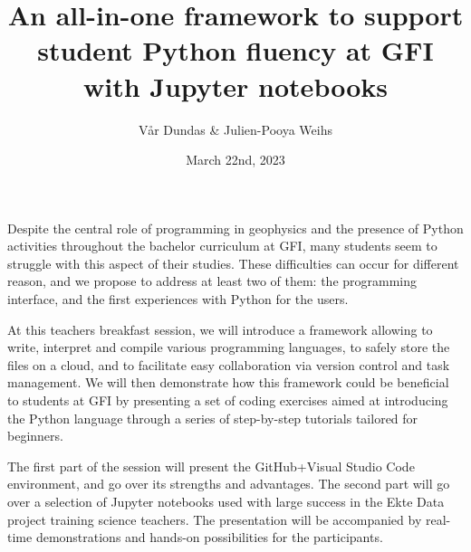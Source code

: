 \documentclass{article}
\title{An all-in-one framework to support student Python fluency at GFI with Jupyter notebooks}
\date{March 22nd, 2023}
\author{Vår Dundas \& Julien-Pooya Weihs}
\begin{document}
\maketitle

Despite the central role of programming in geophysics and the presence of Python activities throughout the bachelor curriculum at GFI, many students seem to struggle with this aspect of their studies. These difficulties can occur for different reason, and we propose to address at least two of them: the programming interface, and the first experiences with Python for the users. 

At this teachers breakfast session, we will introduce a framework allowing to write, interpret and compile various programming languages, to safely store the files on a cloud, and to facilitate easy collaboration via version control and task management. We will then demonstrate how this framework could be beneficial to students at GFI by presenting a set of coding exercises aimed at introducing the Python language through a series of step-by-step tutorials tailored for beginners.

The first part of the session will present the GitHub+Visual Studio Code environment, and go over its strengths and advantages. The second part will go over a selection of Jupyter notebooks used with large success in the Ekte Data project training science teachers. The presentation will be accompanied by real-time demonstrations and hands-on possibilities for the participants.
\end{document}
